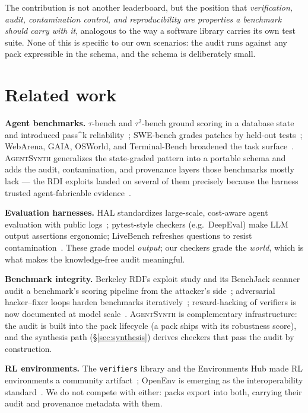 \documentclass[11pt]{article}
\newcommand{\agentsynth}{\textsc{AgentSynth}}
\begin{document}
The contribution is not another leaderboard, but the position that
\emph{verification, audit, contamination control, and reproducibility are
properties a benchmark should carry with it}, analogous to the way a software
library carries its own test suite. None of this is specific to our own
scenarios: the audit runs against any pack expressible in the schema, and the
schema is deliberately small.

\section{Related work}\label{sec:related}

\textbf{Agent benchmarks.} $\tau$-bench and $\tau^2$-bench ground scoring in a
database state and introduced pass\^{}k reliability~\cite{yao2024tau,tau2bench};
SWE-bench grades patches by held-out tests~\cite{swebench}; WebArena, GAIA,
OSWorld, and Terminal-Bench broadened the task
surface~\cite{webarena,gaia,osworld}. \agentsynth{} generalizes the
state-graded pattern into a portable schema and adds the audit, contamination,
and provenance layers those benchmarks mostly lack --- the RDI exploits landed
on several of them precisely because the harness trusted agent-fabricable
evidence~\cite{rdi2026broke}.

\textbf{Evaluation harnesses.} HAL standardizes large-scale, cost-aware agent
evaluation with public logs~\cite{hal}; pytest-style checkers
(e.g.\ DeepEval) make LLM output assertions ergonomic; LiveBench refreshes
questions to resist contamination~\cite{livebench}. These grade model
\emph{output}; our checkers grade the \emph{world}, which is what makes the
knowledge-free audit meaningful.

\textbf{Benchmark integrity.} Berkeley RDI's exploit study and its BenchJack
scanner audit a benchmark's scoring pipeline from the attacker's
side~\cite{rdi2026broke}; adversarial hacker--fixer loops harden benchmarks
iteratively~\cite{hackerfixer}; reward-hacking of verifiers is now documented
at model scale~\cite{gamingverifiers}. \agentsynth{} is complementary
infrastructure: the audit is built into the pack lifecycle (a pack ships with
its robustness score), and the synthesis path (\S\ref{sec:synthesis}) derives
checkers that pass the audit by construction.

\textbf{RL environments.} The \texttt{verifiers} library and the Environments
Hub made RL environments a community artifact~\cite{verifiers}; OpenEnv is
emerging as the interoperability standard~\cite{openenv}. We do not compete
with either: packs export into both, carrying their audit and provenance
metadata with them.
\end{document}
